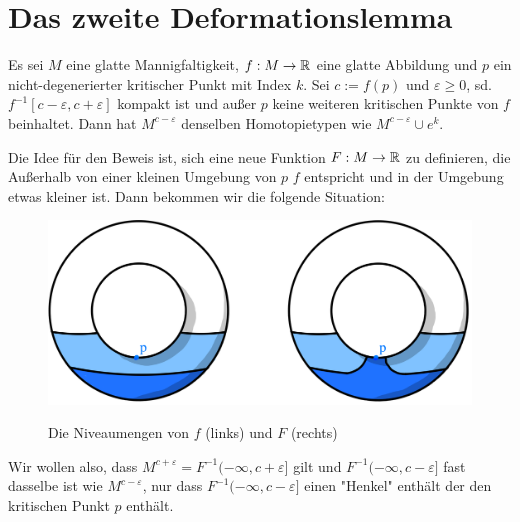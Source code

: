 \section{Das zweite Deformationslemma}

\begin{theorem}
    \label{theorem:zweites deformationslemma}
    Es sei $M$ eine glatte Mannigfaltigkeit, $f: M \rightarrow { \mathbb R }$ eine glatte
    Abbildung und $p$ ein nicht-degenerierter kritischer Punkt mit Index 
    $k$. Sei $c := f(p)$ und $\varepsilon \geq 0$, sd. 
    $f^{-1}[c - \varepsilon, c + \varepsilon]$ kompakt ist und außer $p$ keine 
    weiteren kritischen Punkte von $f$ beinhaltet. Dann hat $M^{c-\varepsilon}$
    denselben Homotopietypen wie $M^{c - \varepsilon} \cup e^k$.
\end{theorem}

Die Idee für den Beweis ist, sich eine neue Funktion $F: M \to { \mathbb R }$ zu definieren,
die Außerhalb von einer kleinen Umgebung von $p$ $f$ entspricht und in der 
Umgebung etwas kleiner ist. Dann bekommen wir die folgende Situation:

\begin{figure}[H]
    \centering
    \includegraphics[width=0.8\linewidth]{resources/Me-Diagram5-sublevelsets-of-f-and-F.jpeg}
    \label{fig:me-diagram5}
    \caption{Die Niveaumengen von $f$ (links) und $F$ (rechts)}
\end{figure}

Wir wollen also, dass $M^{c + \varepsilon} = F^{-1}(- \infty, c + \varepsilon]$ 
gilt und $F^{-1}(-\infty, c - \varepsilon]$ fast dasselbe ist wie 
$M^{c - \varepsilon}$, nur dass $F^{-1}(-\infty, c - \varepsilon]$ einen "Henkel"
enthält der den kritischen Punkt $p$ enthält.

